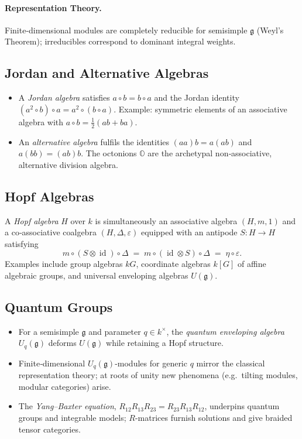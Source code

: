 \paragraph{Representation Theory.}
Finite‑dimensional modules are completely reducible for semisimple \(\mathfrak{g}\) (Weyl’s Theorem);  
irreducibles correspond to dominant integral weights.

\subsection{Jordan and Alternative Algebras}

\begin{itemize}
    \item A \emph{Jordan algebra} satisfies \(a\circ b = b\circ a\) and the Jordan identity  
          \((a^2\circ b)\circ a = a^2\circ (b\circ a)\).  
          Example: symmetric elements of an associative algebra with \(a\circ b=\tfrac12(ab+ba)\).
    \item An \emph{alternative algebra} fulfils the identities  
          \( (aa)b = a(ab) \) and \( a(bb) = (ab)b \).  
          The octonions \(\mathbb{O}\) are the archetypal non‑associative, alternative division algebra.
\end{itemize}

\subsection{Hopf Algebras}

A \emph{Hopf algebra} \(H\) over \(k\) is simultaneously an associative algebra \((H,m,1)\) and a co‑associative coalgebra \((H,\Delta,\varepsilon)\) equipped with an antipode \(S:H\!\to\!H\) satisfying
\[
m\!\circ\!(S\otimes\operatorname{id})\!\circ\!\Delta
\;=\;
m\!\circ\!(\operatorname{id}\otimes S)\!\circ\!\Delta
\;=\;
\eta\!\circ\!\varepsilon.
\]
Examples include group algebras \(kG\), coordinate algebras \(k[G]\) of affine algebraic groups, and universal enveloping algebras \(U(\mathfrak{g})\).

\subsection{Quantum Groups}

\begin{itemize}
    \item For a semisimple \(\mathfrak{g}\) and parameter \(q\in k^{\times}\), the \emph{quantum enveloping algebra} \(U_q(\mathfrak{g})\) deforms \(U(\mathfrak{g})\) while retaining a Hopf structure.
    \item Finite‑dimensional \(U_q(\mathfrak{g})\)-modules for generic \(q\) mirror the classical representation theory; at roots of unity new phenomena (e.g.\ tilting modules, modular categories) arise.
    \item The \emph{Yang–Baxter equation}, \(R_{12}R_{13}R_{23}=R_{23}R_{13}R_{12}\), underpins quantum groups and integrable models; \(R\)-matrices furnish solutions and give braided tensor categories.
\end{itemize}

